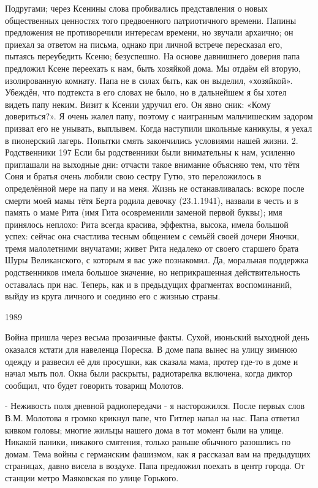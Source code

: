 Подругами; через Ксенины слова пробивались представления о новых общественных ценностях того предвоенного патриотичного времени. Папины предложения не противоречили интересам времени, но звучали архаично; он приехал за ответом на письма, однако при личной встрече пересказал его, пытаясь переубедить Ксеню; безуспешно. На основе давнишнего доверия папа предложил Ксене переехать к нам, быть хозяйкой дома. Мы отдаём ей вторую, изолированную комнату. Папа не в силах быть, как он выделил, «хозяйкой». Убеждён, что подтекста в его словах не было, но в дальнейшем я бы хотел видеть папу неким. Визит к Ксении удручил его. Он явно сник: «Кому довериться?». Я очень жалел папу, поэтому с наигранным мальчишеским задором призвал его не унывать, выплывем. Когда наступили школьные каникулы, я уехал в пионерский лагерь. Попытки смять закончились условиями нашей жизни.
\clearpage
2. Родственники
197 Если бы родственники были внимательны к нам, усиленно приглашали на выходные дни: отчасти такое внимание объясняю тем, что тётя Соня и братья очень любили свою сестру Гутю, это переложилось в определённой мере на папу и на меня. Жизнь не останавливалась: вскоре после смерти моей мамы тётя Берта родила девочку (23.1.1941), назвали в честь и в память о маме Рита (имя Гита осовременили заменой первой буквы); имя принялось неплохо: Рита всегда красива, эффектна, высока, имела большой успех: сейчас она счастлива тесным общением с семьёй своей дочери Яночки, тремя малолетними внучатами; живет Рита недалеко от своего старшего брата Шуры Великанского, с которым я вас уже познакомил. Да, моральная поддержка родственников имела большое значение, но неприкрашенная действительность оставалась при нас.
Теперь, как и в предыдущих фрагментах воспоминаний, выйду из круга личного и соединю его с жизнью страны.

1989

Война пришла через весьма прозаичные факты. Сухой, июньский выходной день оказался кстати для навеленца Пореска. В доме папа вынес на улицу зимнюю одежду и развесил её для просушки, как сказала мама, протер где-то в доме и начал мыть пол. Окна были раскрыты, радиотарелка включена, когда диктор сообщил, что будет говорить товарищ Молотов.

- Неживость поля дневной радиопередачи - я насторожился. После первых слов В.М. Молотова я громко крикнул папе, что Гитлер напал на нас. Папа ответил кивком головы; многие жильцы нашего дома в тот момент были на улице. Никакой паники, никакого смятения, только раньше обычного разошлись по домам. Тема войны с германским фашизмом, как я рассказал вам на предыдущих страницах, давно висела в воздухе. Папа предложил поехать в центр города. От станции метро Маяковская по улице Горького.

